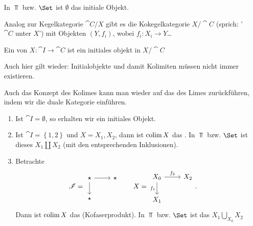 \begin{example}
    In $\Top$ bzw.  $\Set$ ist  $\emptyset$ das initiale Objekt.
\end{example}

\begin{definition}[Kokegelkategorie]\label{def:kokegelkategorie}
    Analog zur Kegelkategorie $\cat{C} / X$ gibt es die Kokegelkategorie $X / \cat{C}$ (sprich: '$\cat{C}$ unter $X$') mit Objekten  $(Y, f_i)$, wobei  $f_i \colon  X_i \to  Y$\ldots
\end{definition}

\begin{definition}[Kolimes]\label{def:kolimes}
    Ein  von $X\colon \cat{I} \to  \cat{C}$ ist ein initiales objekt in $X / \cat{C}$ 
\end{definition}

\begin{warning}
    Auch hier gilt wieder: Initialobjekte und damit Kolimiten müssen nicht immer existieren.
\end{warning}

\begin{oral}
    Auch das Konzept des Kolimes kann man wieder auf das des Limes zurückführen, indem wir die duale Kategorie einführen.
\end{oral}

\begin{example}
    \begin{enumerate}[1)]
        \item Ist $\cat{I} = \emptyset$, so erhalten wir ein initiales Objekt.
        \item Ist $\cat{I} = \left \{1,2\right\} $ und $X = X_1,X_2$, dann ist $\operatorname{colim} X$ das  . In $\Top$ bzw.  $\Set$ ist dieses  $X_1 \coprod X_2$ (mit den entsprechenden Inklusionen).
        \item Betrachte
            \[
            \cat{I} = 
            \begin{tikzcd}
                \star \ar{r} \ar{d} & \star \\
                \star
            \end{tikzcd}
            \qquad
            X = 
            \begin{tikzcd}
                X_0 \ar{r}{f_2} \ar[swap]{d}{f_1}&X_2 \\
                X_1
            \end{tikzcd}
            .\] 
            Dann ist $\operatorname{colim} X$ das   (Kofaserprodukt). In $\Top$ bzw.  $\Set$ ist das  $X_1 \bigcup\limits_{X_0} X_2$ 
    \end{enumerate}
\end{example}
